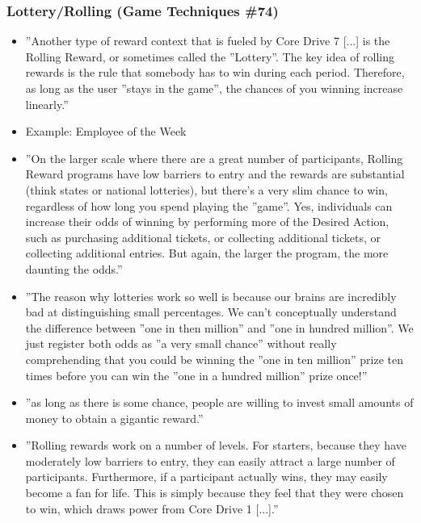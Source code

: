     \subsubsection{Lottery/Rolling (Game Techniques \#74)}
        \begin{itemize}
            \item ''Another type of reward context that is fueled by Core Drive 7 [...] is the Rolling Reward, or sometimes called the ''Lottery''. The key idea of rolling rewards is the rule that somebody has to win during each period. Therefore, as long as the user ''stays in the game'', the chances of you winning increase linearly.''
            \item Example: Employee of the Week
            \item ''On the larger scale where there are a great number of participants, Rolling Reward programs have low barriers to entry and the rewards are substantial (think states or national lotteries), but there's a very slim chance to win, regardless of how long you spend playing the ''game''. Yes, individuals can increase their odds of winning by performing more of the Desired Action, such as purchasing additional tickets, or collecting additional tickets, or collecting additional entries. But again, the larger the program, the more daunting the odds.''
            \item ''The reason why lotteries work so well is because our brains are incredibly bad at distinguishing small percentages. We can't conceptually understand the difference between ''one in then million'' and ''one in hundred million''. We just register both odds as ''a very small chance'' without really comprehending that you could be winning the ''one in ten million'' prize ten times before you can win the ''one in a hundred million'' prize once!''
            \item ''as long as there is some chance, people are willing to invest small amounts of money to obtain a gigantic reward.''
            \item ''Rolling rewards work on a number of levels. For starters, because they have moderately low barriers to entry, they can easily attract a large number of participants. Furthermore, if a participant actually wins, they may easily become a fan for life. This is simply because they feel that they were chosen to win, which draws power from Core Drive 1 [...].''
        \end{itemize}